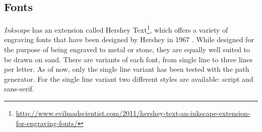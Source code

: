 \subsection{Fonts}

\textit{Inkscape} has an extension called Hershey Text\footnote{\url{http://www.evilmadscientist.com/2011/hershey-text-an-inkscape-extension-for-engraving-fonts/}}, which offers a variety of engraving fonts that have been designed by Hershey in 1967 \cite{hershey1967calligraphy}. While designed for the purpose of being engraved to metal or stone, they are equally well suited to be drawn on sand. There are variants of each font, from single line to three lines per letter. As of now, only the single line variant has been tested with the path generator. For the single line variant two different styles are available: script and sans-serif.

